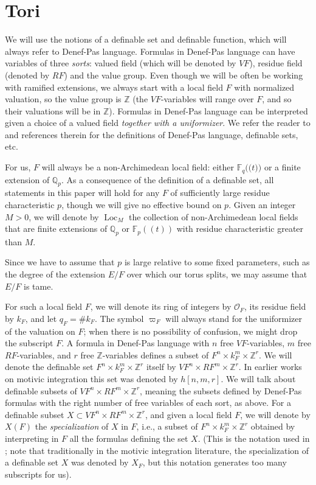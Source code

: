 \documentclass{amsart}
\newcommand{\Q}{{\mathbb Q}}
\newcommand{\F}{{\mathbb F}}
\newcommand{\Z}{{\mathbb Z}}
\newcommand{\ri}{\mathcal{O}}
\newcommand{\loc}{\operatorname{Loc}}
\def\llp{\mathopen{(\!(}}
\def\rrp{\mathopen{)\!)}}
\theoremstyle{plain}
\theoremstyle{definition}
\begin{document}
\section{Tori} \label{sec:tori}
We will use the notions of a definable set and definable function, which will always refer to Denef-Pas language. 
Formulas in Denef-Pas language can have variables of three \emph{sorts}: valued field (which will be denoted by $VF$), residue field (denoted by $RF$) and the value group. Even though we will be often be working with ramified extensions, we always start with a local field $F$ with normalized valuation, so the value group is $\Z$ (the $VF$-variables will range over $F$, and so their valuations will be in $\Z$).
Formulas in Denef-Pas language can be interpreted given a choice of a valued field \emph{together with a uniformizer}. 
We refer the reader to \cite{CGH-ad}  and references therein for the definitions of Denef-Pas language, definable sets, etc. 

For us, $F$ will always be a non-Archimedean local field: either $\F_q\llp t\rrp$ or a finite extension of $\Q_p$.
As a consequence of the definition of a definable set, all statements in this paper will hold for any $F$ of sufficiently large residue characteristic $p$, 
though we will give no effective bound on $p$. 
Given an integer $M>0$, we will denote by $\loc_M$ the collection of non-Archimedean local fields that are finite extensions of $\Q_p$ or $\F_p((t))$ with residue characteristic greater than $M$. 

Since we have to assume that $p$ is large relative to some fixed parameters, such as the degree of the extension $E/F$ over which our torus splits, we may assume that $E/F$ is tame.  

For such a local field $F$, we will denote its ring of integers by $\ri_F$, its residue field by $k_F$, and let $q_F=\# k_F$. The symbol $\varpi_F$ will always stand for the uniformizer of the valuation on $F$; when there is no possibility of confusion, we might drop the subscript $F$. 
A formula in Denef-Pas language  with $n$ free $VF$-variables, $m$ free $RF$-variables, and $r$ free 
$\Z$-variables 
defines a subset of $F^n\times k_F^m \times \Z^r$. 
We will denote the definable set $F^n\times k_F^m \times \Z^r$ itself by $VF^n\times RF^m\times \Z^r$. In earlier works on motivic integration this set was denoted by $h[n,m,r]$. 
We will talk about definable subsets of $VF^n\times RF^m\times \Z^r$, meaning the subsets defined by Denef-Pas formulas with the right number of free variables of each sort, as above. 
For  a definable subset $X\subset VF^n\times RF^m\times \Z^r$, and given a local field $F$,  
we will denote by $X(F)$ the \emph{specialization} of $X$ in $F$, i.e., a subset of $F^n\times k_F^m\times \Z^r$ obtained by interpreting in $F$ all the formulas defining the set $X$. 
(This is the notation used in \cite{hales:transfert}; note that traditionally in the motivic integration literature, the {specialization} of a definable set $X$ was denoted by $X_F$, but this notation generates too many subscripts for us). 
\end{document}
